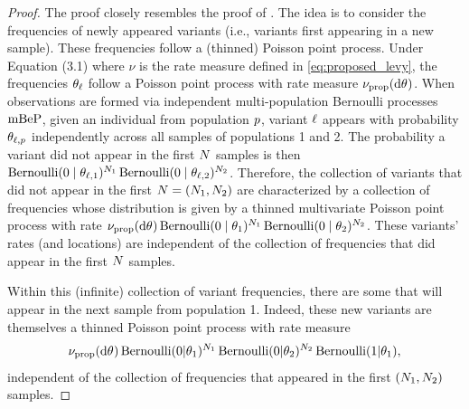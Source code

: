 \begin{proof}
    The proof closely resembles the proof of \citet[Proposition 1]{Masoero2022}. The idea is to consider the frequencies of newly appeared variants (i.e., variants first appearing  in a new sample). These frequencies follow a (thinned) Poisson point process. 
    Under Equation (3.1) where $\nu$ is the rate measure defined in \cref{eq:proposed_levy}, the frequencies $\vecvariantfreq{\variantidx}$ follow a Poisson point process with rate measure $\ratemeasproposed(\de\vecvariantfreq{})$. 
    When observations are formed via independent multi-population Bernoulli processes  $\mathrm{mBeP}$, given an individual from population $p$, variant $\ell$ appears with probability $\theta_{\ell, p}$ independently across all samples of populations 1 and 2. 
    The probability a variant did not appear in the first $\vecsamplesize$ samples is then $\operatorname{Bernoulli}(0 \mid \theta_{\ell, 1})^{N_{1}}\operatorname{Bernoulli}(0 \mid \theta_{\ell, 2})^{N_{2}}$. Therefore, the collection of variants that did not appear in the first $\vecsamplesize=(\samplesize{1}, \samplesize{2})$ are characterized by a collection of frequencies whose distribution is given by a thinned multivariate Poisson point process with rate $\ratemeasproposed(\de\vecvariantfreq{})\BER(0 \mid \variantfreqperpop{1})^{\samplesize{1}}\BER(0 \mid \variantfreqperpop{2})^{\samplesize{2}}$. These variants' rates (and locations) are independent of the collection of frequencies that did appear in the first $\vecsamplesize$ samples.
    
    Within this (infinite) collection of variant frequencies, there are some that will appear in the next sample from population 1. Indeed, these new variants are themselves a thinned Poisson point process with rate measure 
    $$
    \ratemeasproposed(\de\vecvariantfreq{})\BER(0|\variantfreqperpop{1})^{\samplesize{1}}\BER(0|\variantfreqperpop{2})^{\samplesize{2}} \BER(1|\variantfreqperpop{1}),
    $$
  independent of the collection of frequencies that appeared in the first $(N_{1}, N_{2})$ samples.


\end{proof}

